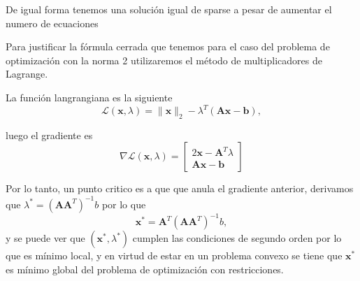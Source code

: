 \documentclass[11pt]{article}
\begin{document}
    De igual forma tenemos una solución igual de sparse a pesar de aumentar
el numero de ecuaciones

    Para justificar la fórmula cerrada que tenemos para el caso del problema
de optimización con la norma 2 utilizaremos el método de multiplicadores
de Lagrange.

La función langrangiana es la siguiente \[ 
\mathcal{L}(\mathbf{x},\lambda)=\lVert \mathbf{x} \rVert_2-\lambda^T(\mathbf{A}\mathbf{x}-\mathbf{b}),
\]

luego el gradiente es \[
\nabla \mathcal{L}(\mathbf{x},\lambda)=\begin{bmatrix}2\mathbf{x}-\mathbf{A}^T\lambda \\
\mathbf{A}\mathbf{x}-\mathbf{b}\end{bmatrix}
\]

    Por lo tanto, un punto critico es a que que anula el gradiente anterior,
derivamos que \(\lambda^\ast=(\mathbf{A}\mathbf{A}^T)^{-1}b\) por lo que
\[ 
    \mathbf{x}^\ast=\mathbf{A}^T(\mathbf{A}\mathbf{A}^T)^{-1}b,
\] y se puede ver que \((\mathbf{x}^\ast,\lambda^\ast)\) cumplen las
condiciones de segundo orden por lo que es mínimo local, y en virtud de
estar en un problema convexo se tiene que \(\mathbf{x}^\ast\) es mínimo
global del problema de optimización con restricciones.


    
    
    
\end{document}
